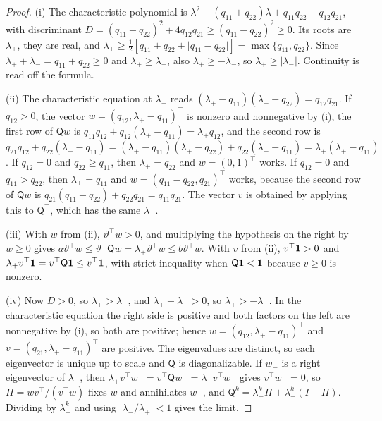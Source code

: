 \begin{proof}
(i) The characteristic polynomial is $\lambda^2-(q_{11}+q_{22})\lambda+q_{11}q_{22}-q_{12}q_{21}$, with discriminant $D=(q_{11}-q_{22})^2+4q_{12}q_{21}\ge(q_{11}-q_{22})^2\ge0$. Its roots are $\lambda_\pm$, they are real, and $\lambda_+\ge\frac12[q_{11}+q_{22}+\lvert q_{11}-q_{22}\rvert]=\max\{q_{11},q_{22}\}$. Since $\lambda_++\lambda_-=q_{11}+q_{22}\ge0$ and $\lambda_+\ge\lambda_-$, also $\lambda_+\ge-\lambda_-$, so $\lambda_+\ge\lvert\lambda_-\rvert$. Continuity is read off the formula.

(ii) The characteristic equation at $\lambda_+$ reads $(\lambda_+-q_{11})(\lambda_+-q_{22})=q_{12}q_{21}$. If $q_{12}>0$, the vector $w=(q_{12},\lambda_+-q_{11})^\top$ is nonzero and nonnegative by (i), the first row of $\mathsf Qw$ is $q_{11}q_{12}+q_{12}(\lambda_+-q_{11})=\lambda_+q_{12}$, and the second row is $q_{21}q_{12}+q_{22}(\lambda_+-q_{11})=(\lambda_+-q_{11})(\lambda_+-q_{22})+q_{22}(\lambda_+-q_{11})=\lambda_+(\lambda_+-q_{11})$. If $q_{12}=0$ and $q_{22}\ge q_{11}$, then $\lambda_+=q_{22}$ and $w=(0,1)^\top$ works. If $q_{12}=0$ and $q_{11}>q_{22}$, then $\lambda_+=q_{11}$ and $w=(q_{11}-q_{22},q_{21})^\top$ works, because the second row of $\mathsf Qw$ is $q_{21}(q_{11}-q_{22})+q_{22}q_{21}=q_{11}q_{21}$. The vector $v$ is obtained by applying this to $\mathsf Q^\top$, which has the same $\lambda_+$.

(iii) With $w$ from (ii), $\vartheta^\top w>0$, and multiplying the hypothesis on the right by $w\ge0$ gives $a\vartheta^\top w\le\vartheta^\top\mathsf Qw=\lambda_+\vartheta^\top w\le b\vartheta^\top w$. With $v$ from (ii), $v^\top\mathbf{1}>0$ and $\lambda_+v^\top\mathbf{1}=v^\top\mathsf Q\mathbf{1}\le v^\top\mathbf{1}$, with strict inequality when $\mathsf Q\mathbf{1}<\mathbf{1}$ because $v\ge0$ is nonzero.

(iv) Now $D>0$, so $\lambda_+>\lambda_-$, and $\lambda_++\lambda_->0$, so $\lambda_+>-\lambda_-$. In the characteristic equation the right side is positive and both factors on the left are nonnegative by (i), so both are positive; hence $w=(q_{12},\lambda_+-q_{11})^\top$ and $v=(q_{21},\lambda_+-q_{11})^\top$ are positive. The eigenvalues are distinct, so each eigenvector is unique up to scale and $\mathsf Q$ is diagonalizable. If $w_-$ is a right eigenvector of $\lambda_-$, then $\lambda_+v^\top w_-=v^\top\mathsf Qw_-=\lambda_-v^\top w_-$ gives $v^\top w_-=0$, so $\Pi=wv^\top/(v^\top w)$ fixes $w$ and annihilates $w_-$, and $\mathsf Q^k=\lambda_+^k\Pi+\lambda_-^k(I-\Pi)$. Dividing by $\lambda_+^k$ and using $\lvert\lambda_-/\lambda_+\rvert<1$ gives the limit.
\end{proof}

